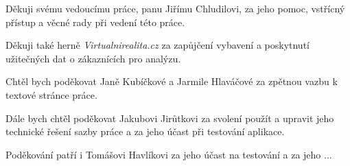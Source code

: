 Děkuji svému vedoucímu práce, panu Jiřímu Chludilovi, za jeho pomoc, vstřícný přístup a věcné rady při vedení této práce.

Děkuji také herně \emph{Virtualnirealita.cz} za zapůjčení vybavení a poskytnutí užitečných dat o zákaznících pro analýzu.

Chtěl bych poděkovat Janě Kubíčkové a Jarmile Hlaváčové za zpětnou vazbu k textové stránce práce.

Dále bych chtěl poděkovat Jakubovi Jirůtkovi za svolení použít a upravit jeho technické řešení sazby práce a za jeho účast při testování aplikace.

Poděkování patří i Tomášovi Havlíkovi za jeho účast na testování a za jeho ...